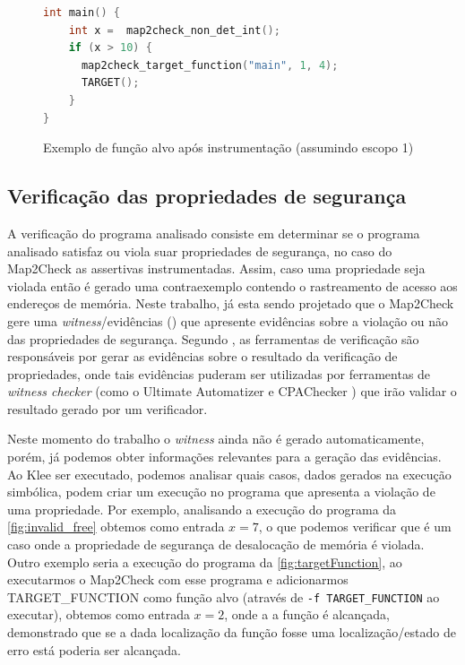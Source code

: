 \begin{figure}[H]
\caption{\label{fig:progExampleTargetInstrumented} Exemplo de função alvo após instrumentação (assumindo escopo 1)}
\begin{center}
\begin{minipage}{0.8\textwidth}
  \begin{lstlisting}[language=C]
int main() {
    int x =  map2check_non_det_int();
    if (x > 10) {
      map2check_target_function("main", 1, 4);
      TARGET();
    }
}
\end{lstlisting}
\end{minipage}
\end{center}
\end{figure}


\subsection{Verificação das propriedades de segurança}

A verificação do programa analisado consiste em determinar se 
o programa analisado satisfaz ou viola suar propriedades de segurança, no caso do Map2Check
as assertivas instrumentadas. Assim, caso uma propriedade seja violada então é gerado uma contraexemplo contendo o rastreamento de acesso aos endereços de memória. 
Neste trabalho, já esta sendo projetado que o Map2Check gere uma 
\textit{witness}/evidências (\cite{beyerA:2015}) que apresente evidências sobre a violação ou não das propriedades de segurança. Segundo \cite{beyerA:2015}, as ferramentas de verificação são responsáveis por gerar as evidências sobre o resultado da verificação de propriedades, onde tais evidências puderam ser utilizadas por ferramentas de \textit{witness checker} (como o Ultimate Automatizer \cite{Heizmann:2015} e CPAChecker \cite{Beyer:2011}) que irão validar o resultado gerado por um verificador. 
\par
Neste momento do trabalho o \textit{witness} ainda não é gerado automaticamente, porém, já podemos obter informações relevantes para a geração das evidências. Ao Klee ser executado, podemos analisar quais casos, dados gerados na execução simbólica, podem criar um execução no programa que apresenta a violação de uma propriedade. Por exemplo, analisando a execução do programa da \autoref{fig:invalid_free} obtemos como entrada $ x = 7 $, o que podemos verificar que é um caso onde a propriedade de segurança de desalocação de memória é violada. 
%
Outro exemplo seria a execução do programa da \autoref{fig:targetFunction}, ao executarmos o Map2Check com esse programa e adicionarmos TARGET\_FUNCTION como função alvo (através de \texttt{-f TARGET\_FUNCTION} ao executar), obtemos como entrada $ x = 2 $, onde a a função é alcançada, demonstrado que se a dada localização da função fosse uma localização/estado de erro está poderia ser alcançada.


